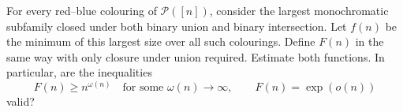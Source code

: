 For every red--blue colouring of $\mathcal P([n])$, consider the largest monochromatic subfamily closed under both binary union and binary intersection. Let $f(n)$ be the minimum of this largest size over all such colourings. Define $F(n)$ in the same way with only closure under union required. Estimate both functions. In particular, are the inequalities
\[F(n)\geq n^{\omega(n)}\quad\text{for some }\omega(n)\to\infty,
\qquad F(n)=\exp(o(n))\]
valid?
